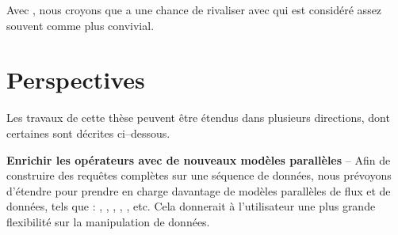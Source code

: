 \begin{conclusion}
Avec , nous croyons que  a une chance de rivaliser avec  qui est consid\'er\'e assez souvent comme plus convivial. 


\section*{\textbf{Perspectives}}

Les travaux de cette th\`ese peuvent \^etre \'etendus dans plusieurs directions, dont certaines sont d\'ecrites ci--dessous.

\textbf{Enrichir les op\'erateurs avec de nouveaux mod\`eles parall\`eles} -- Afin de construire des requ\^etes compl\`etes sur une s\'equence de donn\'ees, nous pr\'evoyons d'\'etendre  pour prendre en charge davantage de mod\`eles parall\`eles de flux et de donn\'ees, tels que : , , , , , etc. Cela donnerait \`a l'utilisateur une plus grande flexibilit\'e sur la manipulation de donn\'ees.


\end{conclusion}




